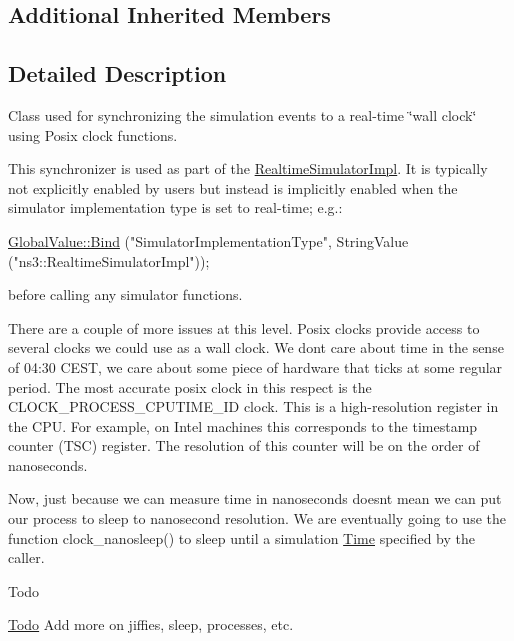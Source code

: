 \subsection*{Additional Inherited Members}


\subsection{Detailed Description}
Class used for synchronizing the simulation events to a real-\/time \char`\"{}wall clock\char`\"{} using Posix clock functions. 

This synchronizer is used as part of the \hyperlink{classns3_1_1RealtimeSimulatorImpl}{Realtime\+Simulator\+Impl}. It is typically not explicitly enabled by users but instead is implicitly enabled when the simulator implementation type is set to real-\/time; e.\+g.\+:


\begin{DoxyCode}
\hyperlink{classns3_1_1GlobalValue_a4fe56773b98d1047cd50e974256fd14a}{GlobalValue::Bind} (\textcolor{stringliteral}{"SimulatorImplementationType"},
                   StringValue (\textcolor{stringliteral}{"ns3::RealtimeSimulatorImpl"}));
\end{DoxyCode}


before calling any simulator functions.

There are a couple of more issues at this level. Posix clocks provide access to several clocks we could use as a wall clock. We don\textquotesingle{}t care about time in the sense of 04\+:30 C\+E\+ST, we care about some piece of hardware that ticks at some regular period. The most accurate posix clock in this respect is the {\ttfamily C\+L\+O\+C\+K\+\_\+\+P\+R\+O\+C\+E\+S\+S\+\_\+\+C\+P\+U\+T\+I\+M\+E\+\_\+\+ID} clock. This is a high-\/resolution register in the C\+PU. For example, on Intel machines this corresponds to the timestamp counter (T\+SC) register. The resolution of this counter will be on the order of nanoseconds.

Now, just because we can measure time in nanoseconds doesn\textquotesingle{}t mean we can put our process to sleep to nanosecond resolution. We are eventually going to use the function {\ttfamily clock\+\_\+nanosleep()} to sleep until a simulation \hyperlink{classns3_1_1Time}{Time} specified by the caller.

\begin{DoxyRefDesc}{Todo}
\item[\hyperlink{todo__todo000008}{Todo}]Add more on jiffies, sleep, processes, etc.\end{DoxyRefDesc}


